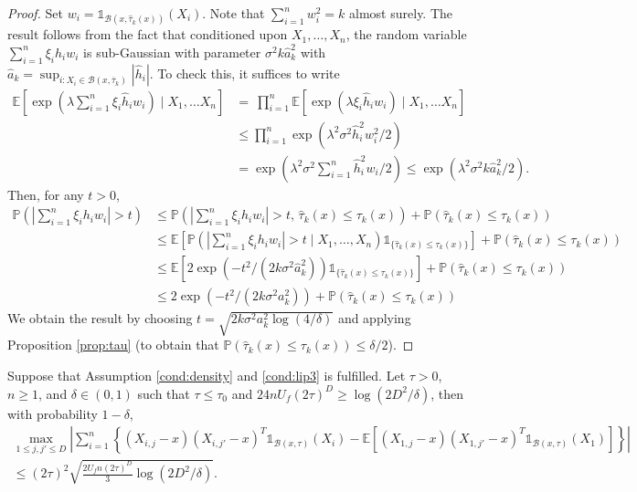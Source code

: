 \begin{proof}
 Set $w_i = \mathds 1 _{ \mathcal{B} (x, \hat  \tau_{k} (x) ) } (X_i )$. Note that $\sum_{i=1} ^n w_i^2 = k$ almost surely. The result follows from the fact that conditioned upon $X_1,\ldots, X_n$, the random variable $ \sum_{i=1} ^n \xi_i h_i w_i$ is sub-Gaussian with parameter $\sigma^2 k \hat a_k^2 $ with $\hat a_k = \sup_{i:X_i\in \mathcal B (x, \overline \tau_k ) } | \hat h_i|$. To check this, it suffices to write
     \begin{align*}
       \mathbb E \left[ \exp\left( \lambda  \sum_{i=1} ^n \xi_i \hat h_i  w_i \right)\mid X_1,\ldots X_n\right]       &=\  \prod_{i=1} ^n \mathbb E \left[ \exp\left( \lambda \xi_i \hat h_i  w_i\right)\mid X_1,\ldots X_n\right]\\
        & \leq  \prod_{i=1} ^n   \exp\left(   \lambda^2  \sigma^2 \hat h_i^2 w_i^2 /2 \right) \\
        &=   \exp\left( \lambda^2  \sigma^2 \sum_{i=1} ^n \hat h_i^2 w_i /2 \right)  \leq \exp\left(  \lambda^2  \sigma^2 k \hat a_k^2 /2 \right).
    \end{align*}
Then, for any $t>0$,
\begin{align*}
\mathbb P \left( \left| \sum_{i=1} ^n \xi_i h_i w_i  \right| > t  \right) &\leq \mathbb P \left( \left| \sum_{i=1} ^n \xi_i h_i w_i  \right| > t  ,\, \hat \tau_k(x)  \leq \tau _k (x)\right) + \mathbb P ( \hat \tau_k(x)  \leq \tau _k (x) ) \\
&\leq  \mathbb E \left[   \mathbb P \left(   \left| \sum_{i=1} ^n \xi_i h_i w_i  \right| > t\mid X_1,\ldots, X_n  \right)  \mathds{1}_{\{ \hat \tau_k(x)  \leq \tau _k (x)\}} \right] + \mathbb P ( \hat \tau_k(x)  \leq \tau _k (x) ) \\
&\leq \mathbb E \left[   2\exp( -t^2 / (2k \sigma^2  \hat a_k^2 ) )  \mathds{1}_{\{ \hat \tau_k(x)  \leq \tau _k (x)\}} \right] + \mathbb P ( \hat \tau_k(x)  \leq \tau _k (x) )\\
&\leq      2\exp( -t^2 / (2k \sigma^2   a_k^2 ) )  + \mathbb P ( \hat \tau_k(x)  \leq \tau _k (x) )
\end{align*}
We obtain the result by choosing $t = \sqrt { 2k \sigma^2   a_k^2  \log( 4 / \delta )} $ and applying Proposition \ref{prop:tau} (to obtain that $\mathbb P ( \hat \tau_k(x)  \leq \tau _k (x) )\leq \delta/2$).
\end{proof}

\begin{proposition}\label{prop:cov_bound}
Suppose that Assumption \ref{cond:density} and \ref{cond:lip3} is fulfilled. Let $\tau >0$, $n\geq 1$, and $\delta\in (0,1)$ such that $ \tau \leq \tau_ 0 $ and   $24 n U_f (2\tau ) ^{D}  \geq   \log(2D^2 /\delta )  $, then with probability $1-\delta$,
\begin{align*}
\max_{1\leq j ,j'\leq D}\left| \sum_{i=1} ^n \left\{  (X_{i,j} - x )(X_{i,j'} - x )^T \mathds{1} _{\mathcal B ( x , \tau) }  (X_i)  -   \mathbb E [  (X_{1,j} - x )(X_{1,j'} - x )^T \mathds{1} _{\mathcal B ( x , \tau) }  (X_1) ] \right\}  \right|& \\
\leq  (2\tau ) ^{2 } \sqrt {  \frac{2 U_f n  (2\tau ) ^{D  }}{3}   \log(2D^2/\delta) } .& 
\end{align*}
\end{proposition}

